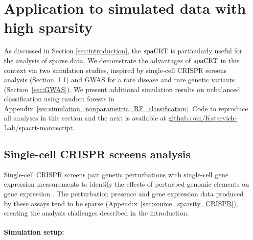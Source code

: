\documentclass[12pt]{article}
\theoremstyle{definition}
\newcommand{\spacrt}{\textnormal{spaCRT}}               %
\begin{document}
  \section{Application to simulated data with high sparsity}\label{sec:simulation} 
  
  As discussed in Section \ref{sec:introduction}, the $\spacrt$ is particularly useful for the analysis of sparse data. We demonstrate the advantages of $\spacrt$ in this context via two simulation studies, inspired by single-cell CRISPR screens analysis (Section~\ref{sec:CRISPR-screens}) and GWAS for a rare disease and rare genetic variants (Section~\ref{sec:GWAS}). We present additional simulation results on unbalanced classification using random forests in Appendix~\ref{sec:simulation_nonparametric_RF_classification}. Code to reproduce all analyses in this section and the next is available at \href{https://github.com/Katsevich-Lab/spacrt-manuscript}{github.com/Katsevich-Lab/spacrt-manuscript}.
  
  \subsection{Single-cell CRISPR screens analysis}\label{sec:CRISPR-screens}
  
  Single-cell CRISPR screens pair genetic perturbations with single-cell gene expression measurements to identify the effects of perturbed genomic elements on gene expression \citep{Dixit2016,Adamson2016}. The perturbation presence and gene expression data produced by these assays tend to be sparse (Appendix~\ref{sec:source_sparsity_CRISPR}), creating the analysis challenges described in the introduction.

  \paragraph{Simulation setup:}
  
\end{document}
